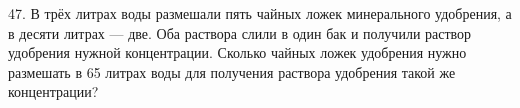47. В трёх литрах воды размешали пять чайных ложек минерального удобрения, а в десяти литрах --- две. Оба раствора слили в один бак и получили раствор удобрения нужной концентрации. Сколько чайных ложек удобрения нужно размешать в 65 литрах воды для получения раствора удобрения такой же концентрации?\\
